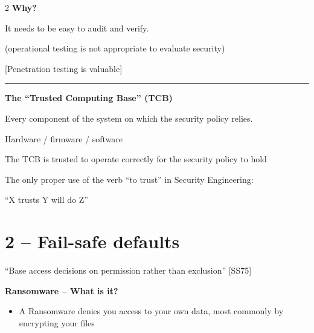 \documentclass[a4paper,9pt]{extarticle}
\newcommand{\separator}{
\vspace{2pt}
\hrule
\vspace{3pt}
}
\begin{document}
\begin{multicols}{2}
\textbf{Why?}

It needs to be easy to audit and verify.

(operational testing is not appropriate to evaluate security)

[Penetration testing is valuable]


\separator


\begin{definition}

\textbf{The ``Trusted Computing Base'' (TCB)}

Every component of the system on which the security policy relies.

Hardware / firmware / software

\end{definition}


\begin{important}

The TCB is trusted to operate correctly for the security policy to hold

\end{important}


\begin{warning}

The only proper use of the verb ``to trust'' in Security Engineering:

``X trusts Y will do Z''

\end{warning}



\section{2 -- Fail-safe defaults}


\begin{important}

``Base access decisions on permission rather than exclusion'' [SS75]

\end{important}


\begin{definition}

\textbf{Ransomware -- What is it?}

\begin{itemize}

\item A Ransomware denies you access to your own data, most commonly by encrypting your files


\end{itemize}
\end{definition}
\end{multicols}
\end{document}
